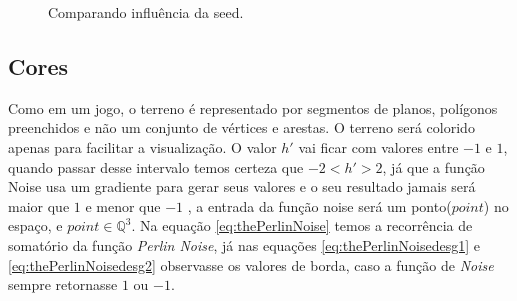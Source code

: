 \begin{figure}[H]
     \centering
     \hspace{0.1cm}
     \hspace{0.1cm}
     \caption{Comparando influência da seed.}
     \label{fig:parametrosSeed}
\end{figure}


\subsection{Cores}
Como em um jogo, o terreno é representado por segmentos de planos, polígonos preenchidos e não um conjunto
de vértices e arestas. O terreno será colorido apenas para facilitar a
visualização. O valor $h'$ vai ficar com valores entre $-1$ e $1$, 
quando passar desse intervalo temos certeza que $-2 < h' > 2$, já que a função Noise 
usa um gradiente para gerar seus valores e o seu resultado jamais será maior que $1$
e menor que $-1$ \cite{perlin1985image}, a entrada da função noise será um ponto($point$) no espaço, e $point \in \mathbb{Q}^{3}$.
Na equação \ref{eq:thePerlinNoise} temos a recorrência de somatório da função
\textit{Perlin Noise}, já nas equações \ref{eq:thePerlinNoisedesg1} e \ref{eq:thePerlinNoisedesg2}
observasse os valores de borda, caso a função de \textit{Noise} sempre retornasse $1$ ou $-1$.

